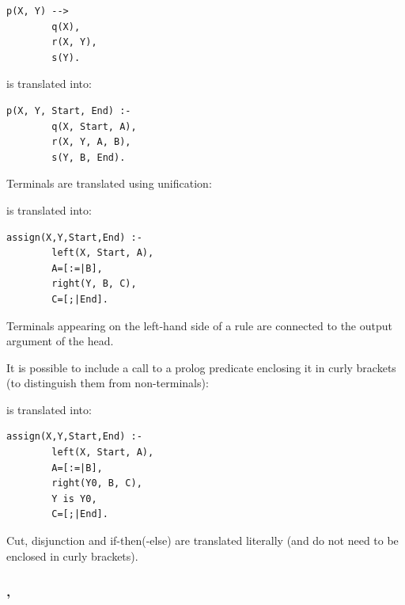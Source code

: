 \begin{Code}
\begin{verbatim}
p(X, Y) -->
        q(X),
        r(X, Y),
        s(Y).
\end{verbatim}
\end{Code}

is translated into:

\begin{Code}
\begin{verbatim}
p(X, Y, Start, End) :-
        q(X, Start, A),
        r(X, Y, A, B),
        s(Y, B, End).
\end{verbatim}
\end{Code}

Terminals are translated using unification:


is translated into:

\begin{Code}
\begin{verbatim}
assign(X,Y,Start,End) :-
        left(X, Start, A),
        A=[:=|B],
        right(Y, B, C),
        C=[;|End].
\end{verbatim}
\end{Code}

Terminals appearing on the left-hand side of a rule are connected to the
output argument of the head.

It is possible to include a call to a prolog predicate enclosing it in curly
brackets (to distinguish them from non-terminals):


is translated into:

\begin{Code}
\begin{verbatim}
assign(X,Y,Start,End) :-
        left(X, Start, A),
        A=[:=|B],
        right(Y0, B, C),
        Y is Y0,
        C=[;|End].
\end{verbatim}
\end{Code}

Cut, disjunction and if-then(-else) are translated literally (and do not need
to be enclosed in curly brackets).

\subsubsection{,\label{expand-term/2}
               }


